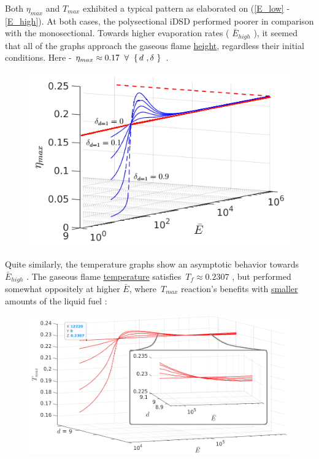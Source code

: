 \documentclass[12pt]{article}
\numberwithin{equation}{section}
\begin{document}
\begin{flushleft}
Both $\eta_{max}$ and $T_{max}$ exhibited a typical pattern as elaborated on (\ref{E_low} - \ref{E_high}). At both cases, the polysectional iDSD performed poorer in comparison with the monosectional. Towards higher evaporation rates ( $\bar{E}_{high}$ ), it seemed that all of the graphs approach the gaseous flame \underline{height}, regardless their initial conditions. Here - $\eta_{max}  \approx 0.17 \hspace{2mm} \forall \hspace{2mm} \{ \, d \ , \delta \ \} $ . 
\begin{figure}[H] 
\centering
\includegraphics[width=0.6 \linewidth, center]{assymptote_eta.png}
\end{figure}

Quite similarly, the temperature graphs show an asymptotic behavior towards \,$\bar{E}_{high}$ . The gaseous flame \underline{temperature} satisfies \,$T_f \approx 0.2307$ , but performed somewhat oppositely at higher $\bar{E}$, where \,$T_{max}$ reaction's benefits with \underline{smaller} amounts of the liquid fuel :
\begin{figure}[H] 
\centering
\includegraphics[width=0.8 \linewidth, center]{assymptote_temp_a.png}
\end{figure}


\end{flushleft}
\end{document}
